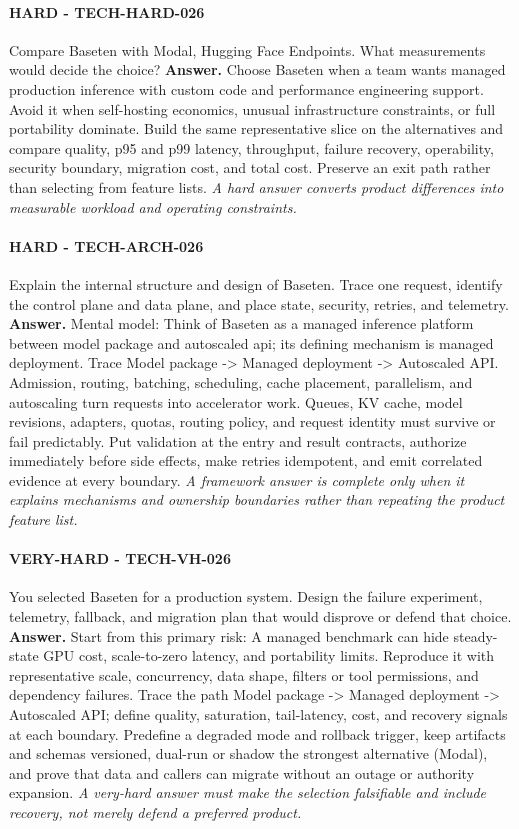 \paragraph{HARD - TECH-HARD-026} Compare Baseten with Modal, Hugging Face Endpoints. What measurements would decide the choice?
\textbf{Answer.} Choose Baseten when a team wants managed production inference with custom code and performance engineering support. Avoid it when self-hosting economics, unusual infrastructure constraints, or full portability dominate. Build the same representative slice on the alternatives and compare quality, p95 and p99 latency, throughput, failure recovery, operability, security boundary, migration cost, and total cost. Preserve an exit path rather than selecting from feature lists.
\textit{A hard answer converts product differences into measurable workload and operating constraints.}
\paragraph{HARD - TECH-ARCH-026} Explain the internal structure and design of Baseten. Trace one request, identify the control plane and data plane, and place state, security, retries, and telemetry.
\textbf{Answer.} Mental model: Think of Baseten as a managed inference platform between model package and autoscaled api; its defining mechanism is managed deployment. Trace Model package -> Managed deployment -> Autoscaled API. Admission, routing, batching, scheduling, cache placement, parallelism, and autoscaling turn requests into accelerator work. Queues, KV cache, model revisions, adapters, quotas, routing policy, and request identity must survive or fail predictably. Put validation at the entry and result contracts, authorize immediately before side effects, make retries idempotent, and emit correlated evidence at every boundary.
\textit{A framework answer is complete only when it explains mechanisms and ownership boundaries rather than repeating the product feature list.}
\paragraph{VERY-HARD - TECH-VH-026} You selected Baseten for a production system. Design the failure experiment, telemetry, fallback, and migration plan that would disprove or defend that choice.
\textbf{Answer.} Start from this primary risk: A managed benchmark can hide steady-state GPU cost, scale-to-zero latency, and portability limits. Reproduce it with representative scale, concurrency, data shape, filters or tool permissions, and dependency failures. Trace the path Model package -> Managed deployment -> Autoscaled API; define quality, saturation, tail-latency, cost, and recovery signals at each boundary. Predefine a degraded mode and rollback trigger, keep artifacts and schemas versioned, dual-run or shadow the strongest alternative (Modal), and prove that data and callers can migrate without an outage or authority expansion.
\textit{A very-hard answer must make the selection falsifiable and include recovery, not merely defend a preferred product.}
